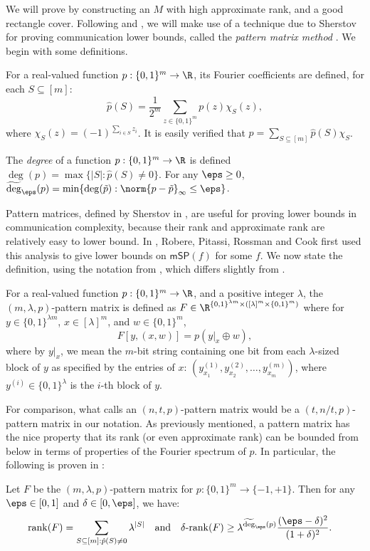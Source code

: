 \documentclass{toc}
\begin{document}
We will prove  by constructing an $M$ with high approximate rank, and a good rectangle cover. Following \cite{RPRC16} and \cite{PR17}, we will make use of a technique due to Sherstov for proving communication lower bounds, called the \emph{pattern matrix method} \cite{She09}.
We begin with some definitions. 

\begin{definition} 
For a real-valued function $p:\{0,1\}^m\rightarrow\R$, its Fourier coefficients are defined, for each $S\subseteq[m]$:
$$\hat{p}(S)=\frac{1}{2^m}\sum_{z\in\{0,1\}^m}p(z)\chi_S(z),$$
where $\chi_S(z)=(-1)^{\sum_{i\in S}z_i}$. It is easily verified that $p=\sum_{S\subseteq[m]}\hat{p}(S)\chi_S$. 
\end{definition}

\begin{definition}
The \emph{degree} of a function $p:\{0,1\}^m\rightarrow\R$ is defined $\deg(p)=\max\{|S|:\hat{p}(S)\neq 0\}$. For any $\eps\geq 0$, $\widetilde{\deg}_{\eps}(p)=\min\{\deg(\tilde p):\norm{p-\tilde p}_\infty\leq \eps\}$.
\end{definition}

Pattern matrices, defined by Sherstov in \cite{She09}, are useful for proving lower bounds in communication complexity, because their rank and approximate rank are relatively easy to lower bound. In \cite{RPRC16}, Robere, Pitassi, Rossman and Cook first used this analysis to give lower bounds on $\mathsf{mSP}(f)$ for some $f$. 
We now state the definition, using the notation from \cite{PR17}, which differs slightly from \cite{She09}.
\begin{definition}\label{def:pattern}
For a real-valued function $p:\{0,1\}^m\rightarrow\R$, and a positive integer $\lambda$, the $(m,\lambda,p)$-pattern matrix is defined as $F\in\R^{\{0,1\}^{\lambda m}\times ([\lambda]^m\times \{0,1\}^m)}$ where for $y\in \{0,1\}^{\lambda m}$, $x\in [\lambda]^m$, and $w\in\{0,1\}^m$, 
$$F[y,(x,w)]=p(y|_x\oplus w),$$
where by $y|_x$, we mean the $m$-bit string containing one bit from each $\lambda$-sized block of $y$ as specified by the entries of $x$: $(y^{(1)}_{x_1},y^{(2)}_{x_2},\dots,y^{(m)}_{x_m})$, where $y^{(i)}\in\{0,1\}^\lambda$ is the $i$-th block of $y$.
\end{definition}
For comparison, what \cite{She09} calls an $(n,t,p)$-pattern matrix would be a $(t,n/t,p)$-pattern matrix in our notation. As previously mentioned, a pattern matrix has the nice property that its rank (or even approximate rank) can be
bounded from below %
in terms of properties of the Fourier spectrum of $p$. In particular, the following is proven in \cite{She09}: 
\begin{lemma}\label{lem:Sherstov}
Let $F$ be the $(m,\lambda,p)$-pattern matrix for $p:\{0,1\}^m\rightarrow\{-1,+1\}$. Then for any $\eps\in[0,1]$ and $\delta\in [0,\eps]$, we have:
\begin{align*}
\mathrm{rank}(F)=\sum_{S\subseteq[m]:\hat{p}(S)\neq 0}\lambda^{|S|}
&\quad \mbox{and}\quad \delta\mbox{-}\mathrm{rank}(F)\geq \lambda^{\widetilde{\deg}_\eps(p)}\frac{(\eps-\delta)^2}{(1+\delta)^2}.
\end{align*}
\end{lemma}
\end{document}
